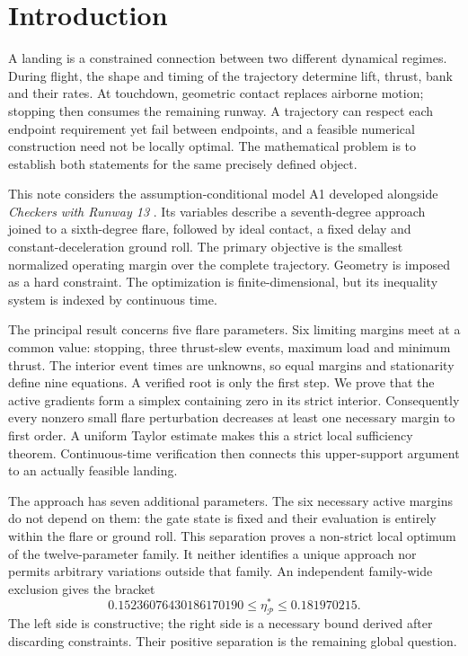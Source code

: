 \section{Introduction}
A landing is a constrained connection between two different dynamical regimes. During flight, the shape and timing of the trajectory determine lift, thrust, bank and their rates. At touchdown, geometric contact replaces airborne motion; stopping then consumes the remaining runway. A trajectory can respect each endpoint requirement yet fail between endpoints, and a feasible numerical construction need not be locally optimal. The mathematical problem is to establish both statements for the same precisely defined object.

This note considers the assumption-conditional model A1 developed alongside \emph{Checkers with Runway 13} \citep{v5,repository}. Its variables describe a seventh-degree approach joined to a sixth-degree flare, followed by ideal contact, a fixed delay and constant-deceleration ground roll. The primary objective is the smallest normalized operating margin over the complete trajectory. Geometry is imposed as a hard constraint. The optimization is finite-dimensional, but its inequality system is indexed by continuous time.

The principal result concerns five flare parameters. Six limiting margins meet at a common value: stopping, three thrust-slew events, maximum load and minimum thrust. The interior event times are unknowns, so equal margins and stationarity define nine equations. A verified root is only the first step. We prove that the active gradients form a simplex containing zero in its strict interior. Consequently every nonzero small flare perturbation decreases at least one necessary margin to first order. A uniform Taylor estimate makes this a strict local sufficiency theorem. Continuous-time verification then connects this upper-support argument to an actually feasible landing.

The approach has seven additional parameters. The six necessary active margins do not depend on them: the gate state is fixed and their evaluation is entirely within the flare or ground roll. This separation proves a non-strict local optimum of the twelve-parameter family. It neither identifies a unique approach nor permits arbitrary variations outside that family. An independent family-wide exclusion gives the bracket
\begin{equation}\label{eq:bracket}
 0.15236076430186170190\leq\eta^*_{\mathcal P}
 \leq 0.181970215.
\end{equation}
The left side is constructive; the right side is a necessary bound derived after discarding constraints. Their positive separation is the remaining global question.

